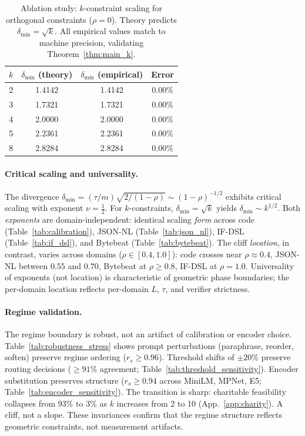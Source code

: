 \documentclass{article}
\theoremstyle{plain}
\theoremstyle{definition}
\theoremstyle{remark}
\newcommand{\appref}[1]{App.~\ref{#1}}
\begin{document}
\begin{table}[ht]
\centering
\small
\caption{Ablation study: $k$-constraint scaling for orthogonal constraints ($\rho=0$). Theory predicts $\delta_{\min} = \sqrt{k}$. All empirical values match to machine precision, validating Theorem~\ref{thm:main_k}.}
\label{tab:ablation}
\begin{tabular}{cccc}
\toprule
$k$ & $\delta_{\min}$ (theory) & $\delta_{\min}$ (empirical) & Error \\
\midrule
2 & 1.4142 & 1.4142 & 0.00\% \\
3 & 1.7321 & 1.7321 & 0.00\% \\
4 & 2.0000 & 2.0000 & 0.00\% \\
5 & 2.2361 & 2.2361 & 0.00\% \\
8 & 2.8284 & 2.8284 & 0.00\% \\
\bottomrule
\end{tabular}
\end{table}

\paragraph{Critical scaling and universality.}
The divergence $\delta_{\min} = (\tau/m)\sqrt{2/(1-\rho)} \sim (1-\rho)^{-1/2}$ exhibits critical scaling with exponent $\nu = \tfrac{1}{2}$. For $k$-constraints, $\delta_{\min} = \sqrt{k}$ yields $\delta_{\min} \sim k^{1/2}$. Both \emph{exponents} are domain-independent: identical scaling \emph{form} across code (Table~\ref{tab:calibration}), JSON-NL (Table~\ref{tab:json_nl}), IF-DSL (Table~\ref{tab:if_dsl}), and Bytebeat (Table~\ref{tab:bytebeat}). The cliff \emph{location}, in contrast, varies across domains ($\rho \in [0.4, 1.0]$): code crosses near $\rho{\approx}0.4$, JSON-NL between $0.55$ and $0.70$, Bytebeat at $\rho \ge 0.8$, IF-DSL at $\rho{=}1.0$. Universality of exponents (not location) is characteristic of geometric phase boundaries; the per-domain location reflects per-domain $L$, $\tau$, and verifier strictness.

\paragraph{Regime validation.}
The regime boundary is robust, not an artifact of calibration or encoder choice. Table~\ref{tab:robustness_stress} shows prompt perturbations (paraphrase, reorder, soften) preserve regime ordering ($r_s \geq 0.96$). Threshold shifts of $\pm 20\%$ preserve routing decisions ($\geq 91\%$ agreement; Table~\ref{tab:threshold_sensitivity}). Encoder substitution preserves structure ($r_s \geq 0.94$ across MiniLM, MPNet, E5; Table~\ref{tab:encoder_sensitivity}). The transition is sharp: charitable feasibility collapses from 93\% to 3\% as $k$ increases from 2 to 10 (\appref{app:charity}). A cliff, not a slope. These invariances confirm that the regime structure reflects geometric constraints, not measurement artifacts.
\end{document}
